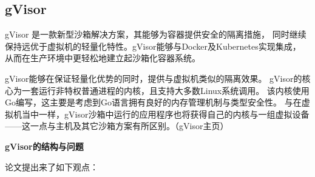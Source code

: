 \documentclass[AutoFakeBold,a4paper]{ctexart}
\begin{document}
\subsection{gVisor}
gVisor 是一款新型沙箱解决方案，其能够为容器提供安全的隔离措施，
同时继续保持远优于虚拟机的轻量化特性。gVisor能够与Docker及Kubernetes实现集成，
从而在生产环境中更轻松地建立起沙箱化容器系统。

gVisor能够在保证轻量化优势的同时，提供与虚拟机类似的隔离效果。
gVisor的核心为一套运行非特权普通进程的内核，且支持大多数Linux系统调用。
该内核使用Go编写，这主要是考虑到Go语言拥有良好的内存管理机制与类型安全性。
与在虚拟机当中一样，gVisor沙箱中运行的应用程序也将获得自己的内核与一组虚拟设备
——这一点与主机及其它沙箱方案有所区别。（gVisor主页）

\textbf{gVisor的结构与问题}

论文\cite{234857}提出来了如下观点：
\end{document}
